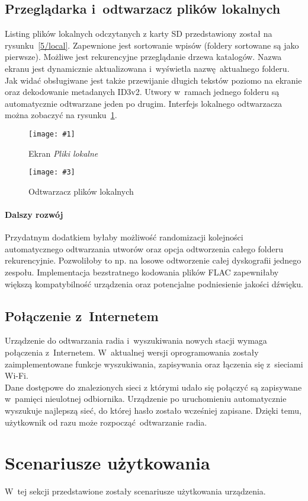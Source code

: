 \documentclass[polish]{aghengthesis}
\newcommand{\imgintss}[5]{
	\begin{figure}[{#5}]
		\centering
		\begin{minipage}{.45\textwidth}
			\centering
			\texttt{[image: \#1]}
			\caption{#2}
			\label{#1}
		\end{minipage}%
		\hfill
		\begin{minipage}{.45\textwidth}
			\centering
			\texttt{[image: \#3]}
			\caption{#4}
			\label{#3}
		\end{minipage}
	\end{figure}
}
\newcommand{\imghss}[4]{\imgintss{#1}{#2}{#3}{#4}{H}}
\begin{document}
		\subsection{Przeglądarka i~odtwarzacz plików lokalnych}
			Listing plików lokalnych odczytanych z karty SD przedstawiony został na rysunku~\ref{5/local}.
			Zapewnione jest sortowanie wpisów (foldery sortowane są jako pierwsze). Możliwe jest rekurencyjne przeglądanie drzewa katalogów. Nazwa ekranu jest dynamicznie aktualizowana i~wyświetla nazwę aktualnego folderu. Jak widać obsługiwane jest także przewijanie długich tekstów poziomo na ekranie oraz dekodowanie metadanych ID3v2. Utwory w~ramach jednego folderu są automatycznie odtwarzane jeden po drugim. Interfejs lokalnego odtwarzacza można zobaczyć na rysunku~\ref{5/local_play}.
			
			\imghss{5/local}{Ekran \textit{Pliki lokalne}}{5/local_play}{Odtwarzacz plików lokalnych}
			
			\paragraph{Dalszy rozwój}
				Przydatnym dodatkiem byłaby możliwość randomizacji kolejności automatycznego odtwarzania utworów oraz opcja odtworzenia całego folderu rekurencyjnie. Pozwoliłoby to np. na losowe odtworzenie całej dyskografii jednego zespołu.
				Implementacja bezstratnego kodowania plików FLAC zapewniłaby większą kompatybilność urządzenia oraz potencjalne podniesienie jakości dźwięku.
		
		\subsection{Połączenie z~Internetem}
			Urządzenie do odtwarzania radia i~wyszukiwania nowych stacji wymaga połączenia z~Internetem. W~aktualnej wersji oprogramowania zostały zaimplementowane funkcje wyszukiwania, zapisywania oraz łączenia się z~sieciami Wi-Fi.
			$ $\\
			
			Dane dostępowe do znalezionych sieci z którymi udało się połączyć są zapisywane w~pamięci nieulotnej odbiornika. Urządzenie po uruchomieniu automatycznie wyszukuje najlepszą sieć, do której hasło zostało wcześniej zapisane. Dzięki temu, użytkownik od razu może rozpocząć odtwarzanie radia.
	
	\section{Scenariusze użytkowania}
		W~tej sekcji przedstawione zostały scenariusze użytkowania urządzenia.
	
\end{document}
